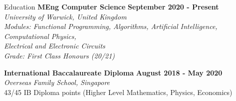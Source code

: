\documentclass{resume}
\begin{document}
    \begin{rSection}{Education}
        {\bf MEng Computer Science} \hfill {\bf September 2020 - Present} \\
        {\em University of Warwick, United Kingdom} \\
        {\em Modules: Functional Programming, Algorithms, Artificial Intelligence, Computational Physics, \\Electrical and Electronic Circuits}\\
        {\em Grade: First Class Honours (20/21)}

        {\bf International Baccalaureate Diploma} \hfill {\bf August 2018 - May 2020} \\
        {\em Overseas Family School, Singapore}\\
        {43/45 IB Diploma points (Higher Level Mathematics, Physics, Economics)}
    \end{rSection}
\end{document}
